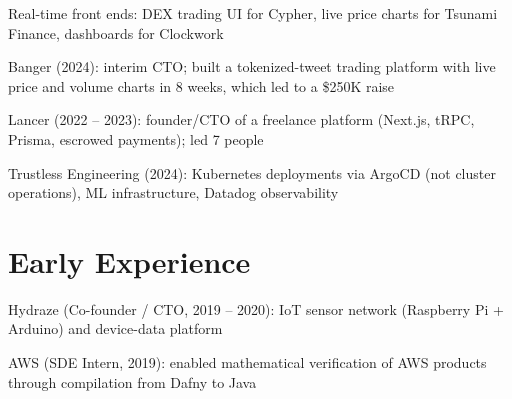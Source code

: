 \documentclass[print]{jack-resume}
\begin{document}
\begin{tightemize}
    \item Real-time front ends: DEX trading UI for Cypher, live price charts for Tsunami Finance, dashboards for Clockwork
    \item Banger (2024): interim CTO; built a tokenized-tweet trading platform with live price and volume charts in 8 weeks, which led to a \$250K raise
    \item Lancer (2022 -- 2023): founder/CTO of a freelance platform (Next.js, tRPC, Prisma, escrowed payments); led 7 people
    \item Trustless Engineering (2024): Kubernetes deployments via ArgoCD (not cluster operations), ML infrastructure, Datadog observability
\end{tightemize}
\sectionsep

\section{Early Experience}
\vspace{1.4em}
\begin{tightemize}
    \item Hydraze (Co-founder / CTO, 2019 -- 2020): IoT sensor network (Raspberry Pi + Arduino) and device-data platform
    \item AWS (SDE Intern, 2019): enabled mathematical verification of AWS products through compilation from Dafny to Java
\end{tightemize}

\begin{minipage}[t]{0.04\textwidth}
    \hfill
\end{minipage}
\end{document}
